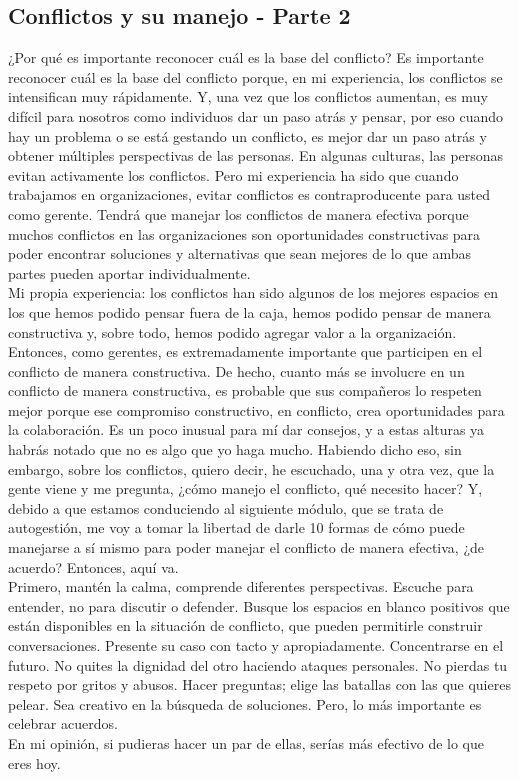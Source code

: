 \documentclass[10pt]{book}
\begin{document}
\subsection{Conflictos y su manejo - Parte 2}
¿Por qué es importante reconocer cuál es la base del conflicto? Es importante reconocer cuál es la base del conflicto porque, en mi experiencia, los conflictos se intensifican muy rápidamente. Y, una vez que los conflictos aumentan, es muy difícil para nosotros como individuos dar un paso atrás y pensar, por eso cuando hay un problema o se está gestando un conflicto, es mejor dar un paso atrás y obtener múltiples perspectivas de las personas. En algunas culturas, las personas evitan activamente los conflictos. Pero mi experiencia ha sido que cuando trabajamos en organizaciones, evitar conflictos es contraproducente para usted como gerente. Tendrá que manejar los conflictos de manera efectiva porque muchos conflictos en las organizaciones son oportunidades constructivas para poder encontrar soluciones y alternativas que sean mejores de lo que ambas partes pueden aportar individualmente.\\
Mi propia experiencia: los conflictos han sido algunos de los mejores espacios en los que hemos podido pensar fuera de la caja, hemos podido pensar de manera constructiva y, sobre todo, hemos podido agregar valor a la organización. Entonces, como gerentes, es extremadamente importante que participen en el conflicto de manera constructiva. De hecho, cuanto más se involucre en un conflicto de manera constructiva, es probable que sus compañeros lo respeten mejor porque ese compromiso constructivo, en conflicto, crea oportunidades para la colaboración. Es un poco inusual para mí dar consejos, y a estas alturas ya habrás notado que no es algo que yo haga mucho. Habiendo dicho eso, sin embargo, sobre los conflictos, quiero decir, he escuchado, una y otra vez, que la gente viene y me pregunta, ¿cómo manejo el conflicto, qué necesito hacer? Y, debido a que estamos conduciendo al siguiente módulo, que se trata de autogestión, me voy a tomar la libertad de darle 10 formas de cómo puede manejarse a sí mismo para poder manejar el conflicto de manera efectiva, ¿de acuerdo? Entonces, aquí va.\\
Primero, mantén la calma, comprende diferentes perspectivas. Escuche para entender, no para discutir o defender. Busque los espacios en blanco positivos que están disponibles en la situación de conflicto, que pueden permitirle construir conversaciones. Presente su caso con tacto y apropiadamente. Concentrarse en el futuro. No quites la dignidad del otro haciendo ataques personales. No pierdas tu respeto por gritos y abusos. Hacer preguntas; elige las batallas con las que quieres pelear. Sea creativo en la búsqueda de soluciones. Pero, lo más importante es celebrar acuerdos.\\
En mi opinión, si pudieras hacer un par de ellas, serías más efectivo de lo que eres hoy.
\end{document}
